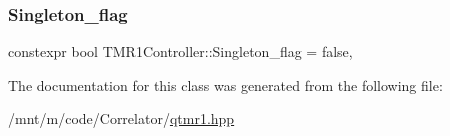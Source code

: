 \subsubsection{\texorpdfstring{Singleton\+\_\+flag}{Singleton\_flag}}
{\footnotesize\ttfamily constexpr bool T\+M\+R1\+Controller\+::\+Singleton\+\_\+flag = false\hspace{0.3cm}{\ttfamily [static]}, {\ttfamily [private]}}



The documentation for this class was generated from the following file\+:\begin{DoxyCompactItemize}
\item 
/mnt/m/code/\+Correlator/\hyperlink{qtmr1_8hpp}{qtmr1.\+hpp}\end{DoxyCompactItemize}
